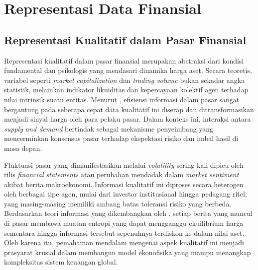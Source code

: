 \section{Representasi Data Finansial}

\subsection{Representasi Kualitatif dalam Pasar Finansial}

Representasi kualitatif dalam pasar finansial merupakan abstraksi dari kondisi fundamental dan psikologis yang mendasari dinamika harga aset. Secara teoretis, variabel seperti \textit{market capitalization} dan \textit{trading volume} bukan sekadar angka statistik, melainkan indikator likuiditas dan kepercayaan kolektif agen terhadap nilai intrinsik suatu entitas. Menurut \cite{fama_1970}, efisiensi informasi dalam pasar sangat bergantung pada seberapa cepat data kualitatif ini diserap dan ditransformasikan menjadi sinyal harga oleh para pelaku pasar. Dalam konteks ini, interaksi antara \textit{supply and demand} bertindak sebagai mekanisme penyeimbang yang mencerminkan konsensus pasar terhadap ekspektasi risiko dan imbal hasil di masa depan.

Fluktuasi pasar yang dimanifestasikan melalui \textit{volatility} sering kali dipicu oleh rilis \textit{financial statements} atau perubahan mendadak dalam \textit{market sentiment} akibat berita makroekonomi. Informasi kualitatif ini diproses secara heterogen oleh berbagai tipe agen, mulai dari investor institusional hingga pedagang ritel, yang masing-masing memiliki ambang batas toleransi risiko yang berbeda. Berdasarkan teori informasi yang dikembangkan oleh \cite{shannon_1948}, setiap berita yang muncul di pasar membawa muatan entropi yang dapat mengganggu ekuilibrium harga sementara hingga informasi tersebut sepenuhnya terdiskon ke dalam nilai aset. Oleh karena itu, pemahaman mendalam mengenai aspek kualitatif ini menjadi prasyarat krusial dalam membangun model ekonofisika yang mampu menangkap kompleksitas sistem keuangan global.

